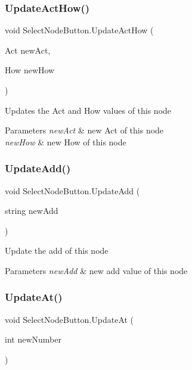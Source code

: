 \subsubsection{\texorpdfstring{Update\+Act\+How()}{UpdateActHow()}}
{\footnotesize\ttfamily void Select\+Node\+Button.\+Update\+Act\+How (\begin{DoxyParamCaption}\item[{Act}]{new\+Act,  }\item[{How}]{new\+How }\end{DoxyParamCaption})}



Updates the Act and How values of this node 


\begin{DoxyParams}{Parameters}
{\em new\+Act} & new Act of this node \\
\hline
{\em new\+How} & new How of this node \\
\hline
\end{DoxyParams}
\mbox{\label{class_select_node_button_aff3ff5c856eda7efdb0509cd09e7930e}} 
\subsubsection{\texorpdfstring{Update\+Add()}{UpdateAdd()}}
{\footnotesize\ttfamily void Select\+Node\+Button.\+Update\+Add (\begin{DoxyParamCaption}\item[{string}]{new\+Add }\end{DoxyParamCaption})}



Update the add of this node 


\begin{DoxyParams}{Parameters}
{\em new\+Add} & new add value of this node \\
\hline
\end{DoxyParams}
\mbox{\label{class_select_node_button_af473e0efc29077bd547d6aa39ed5afc0}} 
\subsubsection{\texorpdfstring{Update\+At()}{UpdateAt()}}
{\footnotesize\ttfamily void Select\+Node\+Button.\+Update\+At (\begin{DoxyParamCaption}\item[{int}]{new\+Number }\end{DoxyParamCaption})}




